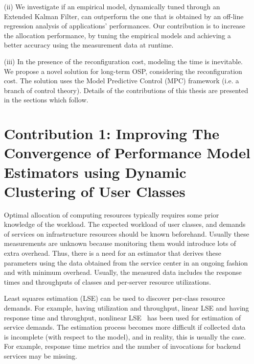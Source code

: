 (ii) We investigate if an empirical model, dynamically tuned through an Extended Kalman Filter, can outperform the one that is obtained by an off-line regression analysis of applications' performances. %
Our contribution is to increase the allocation performance, by tuning the empirical models and achieving a better accuracy using the measurement data at runtime.  

(iii) In the presence of the reconfiguration cost, modeling the time is inevitable.
We propose a novel solution for long-term OSP, considering the reconfiguration cost. The solution uses the Model Predictive Control (MPC) framework (i.e. a branch of control theory).
Details of the contributions of this thesis are presented in the sections which follow.

 \section{Contribution 1: Improving The Convergence of Performance Model Estimators using Dynamic Clustering of User Classes}
 Optimal allocation of computing resources typically requires some prior knowledge of the workload.
The expected workload of user classes, and demands of services on infrastructure resources should be known beforehand. Usually these measurements are unknown because monitoring them would introduce lots of extra overhead. 
Thus, there is a need for an estimator that derives these parameters using the data obtained from the service center in an ongoing fashion and with minimum overhead. Usually, the measured data includes the response times and throughputs of classes and per-server resource utilizations.

Least squares estimation (LSE) can be used to discover per-class resource demands. For example, having utilization and throughput, linear LSE \cite{pacifici_cpu_2008} and having response time and throughput, nonlinear LSE~\cite{menasce2008computing,rolia_parameter_1995,zhang_regression-based_2007,rolia_correlating_1998} has been used for estimation of service demands. The estimation process becomes more difficult if collected data is incomplete (with respect to
the model), and in reality, this is usually the case. For example, response time metrics and the number of invocations for backend services may be missing. %

